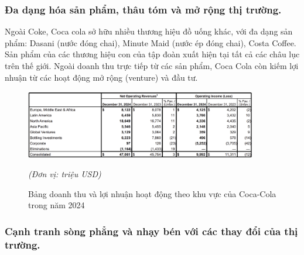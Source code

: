 \documentclass{article}
\begin{document}
    \subsubsection{Đa dạng hóa sản phẩm, thâu tóm và mở rộng thị trường.}

    \vspace{0.2cm}
    Ngoài Coke, Coca cola sở hữu nhiều thương hiệu đồ uống khác, với đa dạng sản phẩm: Dasani (nước đóng chai), Minute Maid (nước ép đóng chai), Costa Coffee. Sản phẩm của các thương hiệu con của tập đoàn xuất hiện tại tất cả các châu lục trên thế giới. Ngoài doanh thu trực tiếp từ các sản phẩm, Coca Cola còn kiếm lợi nhuận từ các hoạt động mở rộng (venture) và đầu tư. 

    \begin{figure}[H]
        \centering
        \includegraphics[width=0.9\textwidth]{assert/img8.png}
        \caption{Bảng doanh thu và lợi nhuận hoạt động theo khu vực của Coca-Cola trong năm 2024}
        \textit{(Đơn vị: triệu USD)}
        \label{fig:img8}
    \end{figure}

    \subsubsection{Cạnh tranh sòng phẳng và nhạy bén với các thay đổi của thị trường.}
\end{document}
